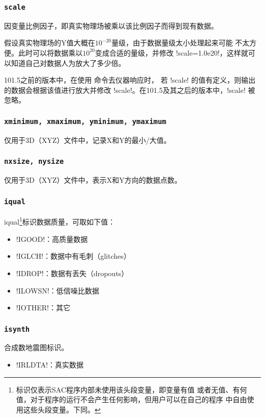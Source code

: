 \subsubsection{\texttt{scale}}
因变量比例因子，即真实物理场被乘以该比例因子而得到现有数据。

假设真实物理场的Y值大概在$10^{-20}$量级，由于数据量级太小处理起来可能
不太方便。此时可以将数据乘以$10^{20}$变成合适的量级，并修改
!scale=1.0e20!，这样就可以知道自己对数据人为放大了多少倍。

101.5之前的版本中，在使用  命令去仪器响应时，
若 !scale! 的值有定义，则输出的数据会根据该值进行放大并修改
!scale!。在101.5及其之后的版本中，!scale! 被忽略。

\subsubsection{\texttt{xminimum, xmaximum, yminimum, ymaximum}}
仅用于3D（XYZ）文件中，记录X和Y的最小/大值。

\subsubsection{\texttt{nxsize, nysize}}
仅用于3D（XYZ）文件中，表示X和Y方向的数据点数。

\subsubsection{\texttt{iqual}\dag}
iqual\footnote{\dag 标识仅表示SAC程序内部未使用该头段变量，即变量有值
或者无值、有何值，对于程序的运行不会产生任何影响，但用户可以在自己的程序
中自由使用这些头段变量。下同。}标识数据质量，可取如下值：
\begin{itemize}
\item !IGOOD!：高质量数据
\item !IGLCH!：数据中有毛刺（glitches）
\item !IDROP!：数据有丢失（dropouts）
\item !ILOWSN!：低信噪比数据
\item !IOTHER!：其它
\end{itemize}

\subsubsection{\texttt{isynth}\dag}
合成数地震图标识。
\begin{itemize}
\item !IRLDTA!：真实数据
\end{itemize}

